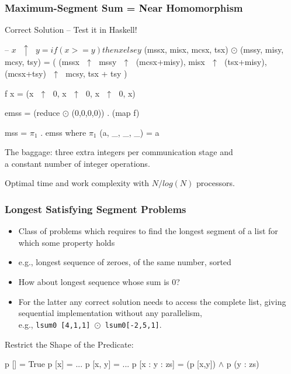 \documentclass{beamer}
\renewcommand{\emph}[1]{\textcolor{structure}{#1}}
\newcommand{\emp}[1]{\textcolor{DikuRed}{ #1}}
\newcommand{\mymath}[1]{$ #1 $}
\newcommand{\myindx}[1]{_{#1}}
\begin{document}
\begin{frame}[fragile,t]
  \frametitle{Maximum-Segment Sum = Near Homomorphism}

\begin{block}{Correct Solution -- Test it in Haskell!}
\begin{colorcode}
-- \mymath{x\mbox{ }\uparrow\mbox{ }y = if(x >= y) then x else y}
(mssx, misx, mcsx, tsx) \mymath{\odot} (mssy, misy, mcsy, tsy) = (
        (mssx\mymath{\mbox{ }\uparrow\mbox{ }}mssy\mymath{\mbox{ }\uparrow\mbox{ }}(mcsx+misy),
         misx\mymath{\mbox{ }\uparrow\mbox{ }}(tsx+misy),
        (mcsx+tsy)\mymath{\mbox{ }\uparrow\mbox{ }}mcsy,
         tsx + tsy
    )

f x = (x\mymath{\mbox{ }\uparrow\mbox{ }}0, x\mymath{\mbox{ }\uparrow\mbox{ }}0, x\mymath{\mbox{ }\uparrow\mbox{ }}0, x)

\emph{emss = (reduce \mymath{\odot} (0,0,0,0)) . (map f)}

\emp{mss  = \mymath{\pi\myindx{1}} . emss}
       where \mymath{\pi\myindx{1}} (a, _, _, _) = a 
\end{colorcode}
\end{block} 

\smallskip

The baggage: three extra integers per communication stage and \\ 
a constant number of integer operations.

Optimal time and work complexity with $N/log(N)$ processors.

\end{frame}


\begin{frame}[fragile,t]
  \frametitle{Longest Satisfying Segment Problems}

\begin{itemize}
    \item Class of problems which requires to find the longest segment of a list
            for which some property holds
    \item e.g., longest sequence of zeroes, of the same number, sorted  
    \item How about longest sequence whose sum is 0?
    \item For the latter any correct solution needs to access the complete list, giving 
            sequential implementation without any parallelism, \\ e.g., {\tt lsum0 [4,1,1] $\odot$ lsum0[-2,5,1]}.
\end{itemize}

\bigskip

\begin{block}{Restrict the Shape of the Predicate:}
\begin{colorcode}
p []           = True
p [x]          = ...
p [x, y]       = ...
p [x : y : zs] = (p [x,y]) \mymath{\wedge} p (y : zs)
\end{colorcode}
\end{block} 

\end{frame}
\end{document}
